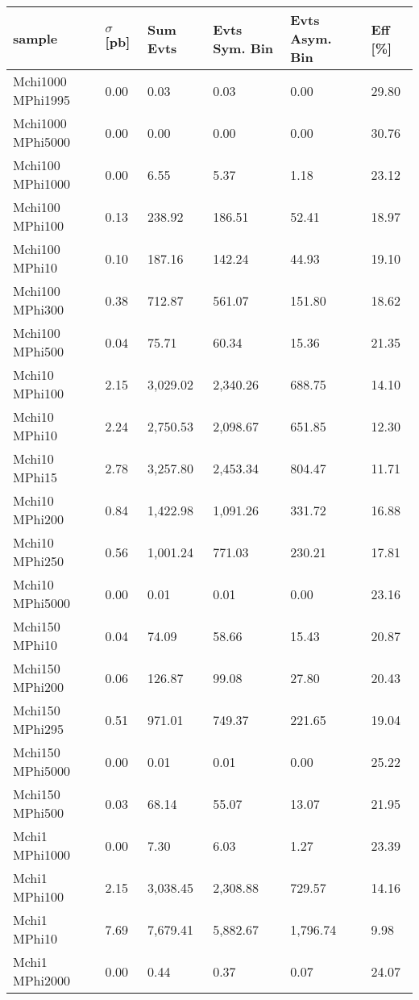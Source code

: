 \begin{table}[h]
\centering
\begin{tabular}{l|lllll}
\hline
sample             & $\sigma$ [pb] & Sum Evts       & Evts Sym. Bin & Evts Asym. Bin & Eff  [\%]   \\\hline
Mchi1000  MPhi1995 & 0.00 & 0.03     & 0.03     & 0.00     & 29.80\\
Mchi1000  MPhi5000 & 0.00 & 0.00     & 0.00     & 0.00     & 30.76\\
Mchi100   MPhi1000 & 0.00 & 6.55     & 5.37     & 1.18     & 23.12\\
Mchi100   MPhi100  & 0.13 & 238.92   & 186.51   & 52.41    & 18.97\\
Mchi100   MPhi10   & 0.10 & 187.16   & 142.24   & 44.93    & 19.10\\
Mchi100   MPhi300  & 0.38 & 712.87   & 561.07   & 151.80   & 18.62\\
Mchi100   MPhi500  & 0.04 & 75.71    & 60.34    & 15.36    & 21.35\\
Mchi10    MPhi100  & 2.15 & 3,029.02 & 2,340.26 & 688.75   & 14.10\\
Mchi10    MPhi10   & 2.24 & 2,750.53 & 2,098.67 & 651.85   & 12.30\\
Mchi10    MPhi15   & 2.78 & 3,257.80 & 2,453.34 & 804.47   & 11.71\\
Mchi10    MPhi200  & 0.84 & 1,422.98 & 1,091.26 & 331.72   & 16.88\\
Mchi10    MPhi250  & 0.56 & 1,001.24 & 771.03   & 230.21   & 17.81\\
Mchi10    MPhi5000 & 0.00 & 0.01     & 0.01     & 0.00     & 23.16\\
Mchi150   MPhi10   & 0.04 & 74.09    & 58.66    & 15.43    & 20.87\\
Mchi150   MPhi200  & 0.06 & 126.87   & 99.08    & 27.80    & 20.43\\
Mchi150   MPhi295  & 0.51 & 971.01   & 749.37   & 221.65   & 19.04\\
Mchi150   MPhi5000 & 0.00 & 0.01     & 0.01     & 0.00     & 25.22\\
Mchi150   MPhi500  & 0.03 & 68.14    & 55.07    & 13.07    & 21.95\\
Mchi1     MPhi1000 & 0.00 & 7.30     & 6.03     & 1.27     & 23.39\\
Mchi1     MPhi100  & 2.15 & 3,038.45 & 2,308.88 & 729.57   & 14.16\\
Mchi1     MPhi10   & 7.69 & 7,679.41 & 5,882.67 & 1,796.74 & 9.98 \\
Mchi1     MPhi2000 & 0.00 & 0.44     & 0.37     & 0.07     & 24.07\\

\end{tabular}
\end{table}

